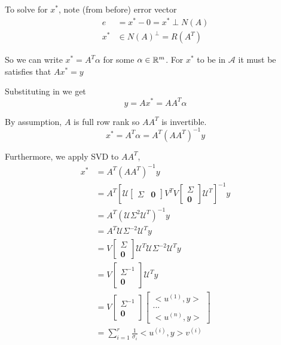 To solve for $x^*$, note (from before) error vector 
\begin{align*}
e &= x^* - 0 = x^* \perp N(A)\\
x^* &\in N(A)^{\perp} = R(A^T)
\end{align*}

So we can write $x^* = A^T\alpha$ for some $\alpha \in \mathbb{R}^m$. 
For $x^*$ to be in $\mathcal{A}$ it must be satisfies that $Ax^* = y$

Substituting in we get 
\begin{equation*}
y = Ax^* = AA^T\alpha
\end{equation*}

By assumption, $A$ is full row rank so $AA^T$ is invertible.
$$x^* = A^T \alpha = A^T(AA^T)^{-1}y$$

Furthermore, we apply SVD to $AA^T$,
\begin{align*}
x^* &= A^T(AA^T)^{-1}y\\
&= A^T\left[\mathcal{U}
\begin{bmatrix}
\Sigma & \mathbf{0}
\end{bmatrix}
V^TV
\begin{bmatrix}
\Sigma\\
\mathbf{0}
\end{bmatrix}
\mathcal{U}^T\right]^{-1}y\\
&= A^T(\mathcal{U}\Sigma^2\mathcal{U}^T)^{-1}y\\
&= A^T\mathcal{U}\Sigma^{-2}\mathcal{U}^Ty\\
&= V
\begin{bmatrix}
\Sigma\\
\mathbf{0}
\end{bmatrix}
\mathcal{U}^T\mathcal{U}\Sigma^{-2}\mathcal{U}^Ty\\
&=V
\begin{bmatrix}
\Sigma^{-1} \\
\mathbf{0}
\end{bmatrix}
\mathcal{U}^Ty\\
&= V
\begin{bmatrix}
\Sigma^{-1}\\
\mathbf{0}
\end{bmatrix}
\begin{bmatrix}
<u^{(1)}, y>\\
...\\
<u^{(n)}, y>
\end{bmatrix}\\
&= \sum^r_{i=1}\frac{1}{\sigma_i}<u^{(i)}, y>v^{(i)}
\end{align*}




